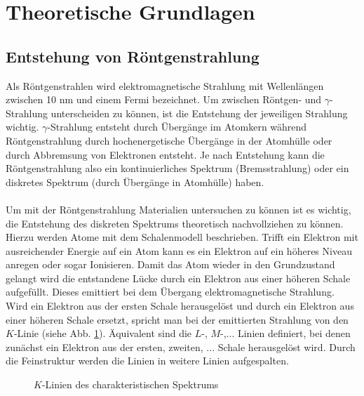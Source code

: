 \section{Theoretische Grundlagen}
\subsection{Entstehung von Röntgenstrahlung}
Als Röntgenstrahlen wird elektromagnetische Strahlung mit Wellenlängen zwischen 10 nm und einem Fermi bezeichnet. Um zwischen Röntgen- und $\gamma$-Strahlung unterscheiden zu können, ist die Entstehung der jeweiligen Strahlung wichtig. $\gamma$-Strahlung entsteht durch Übergänge im Atomkern während Röntgenstrahlung durch hochenergetische Übergänge in der Atomhülle oder durch Abbremsung von Elektronen entsteht. Je nach Entstehung kann die Röntgenstrahlung also ein kontinuierliches Spektrum (Bremsstrahlung) oder ein diskretes Spektrum (durch Übergänge in Atomhülle) haben.\\ \\
Um mit der Röntgenstrahlung Materialien untersuchen zu können ist es wichtig, die Entstehung des diskreten Spektrums theoretisch nachvollziehen zu können. Hierzu werden Atome mit dem Schalenmodell beschrieben. Trifft ein Elektron mit ausreichender Energie auf ein Atom kann es ein Elektron auf ein höheres Niveau anregen oder sogar Ionisieren. Damit das Atom wieder in den Grundzustand gelangt wird die entstandene Lücke durch ein Elektron aus einer höheren Schale aufgefüllt. Dieses emittiert bei dem Übergang elektromagnetische Strahlung. Wird ein Elektron aus der ersten Schale herausgelöst und durch ein Elektron aus einer höheren Schale ersetzt, spricht man bei der emittierten Strahlung von den $K$-Linie (siehe Abb. \ref{fig:k_linien}). Äquivalent sind die $L$-, $M$-,... Linien definiert, bei denen zunächst ein Elektron aus der ersten, zweiten, ... Schale herausgelöst wird. Durch die Feinstruktur werden die Linien in weitere Linien aufgespalten.
\begin{figure}[h]
  \centering
  \caption{$K$-Linien des charakteristischen Spektrums}
  \label{fig:k_linien}
\end{figure}

